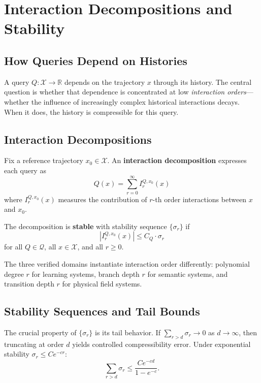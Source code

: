 \chapter{Interaction Decompositions and Stability}

\section{How Queries Depend on Histories}

A query $Q : \mathcal{X} \to \mathbb{R}$ depends on the trajectory $x$ through its history. The central question is whether that dependence is concentrated at low \emph{interaction orders}---whether the influence of increasingly complex historical interactions decays. When it does, the history is compressible for this query.

\section{Interaction Decompositions}

Fix a reference trajectory $x_0 \in \mathcal{X}$. An \textbf{interaction decomposition} expresses each query as
\[
  Q(x) = \sum_{r=0}^{\infty} I_r^{Q,x_0}(x)
\]
where $I_r^{Q,x_0}(x)$ measures the contribution of $r$-th order interactions between $x$ and $x_0$.

\begin{definition}
The decomposition is \textbf{stable} with stability sequence $\{\sigma_r\}$ if
\[
  |I_r^{Q,x_0}(x)| \leq C_Q \cdot \sigma_r
\]
for all $Q \in \mathcal{Q}$, all $x \in \mathcal{X}$, and all $r \geq 0$.
\end{definition}

The three verified domains instantiate interaction order differently: polynomial degree $r$ for learning systems, branch depth $r$ for semantic systems, and transition depth $r$ for physical field systems.

\section{Stability Sequences and Tail Bounds}

The crucial property of $\{\sigma_r\}$ is its tail behavior. If $\sum_{r>d} \sigma_r \to 0$ as $d \to \infty$, then truncating at order $d$ yields controlled compressibility error. Under exponential stability $\sigma_r \leq Ce^{-cr}$:
\[
  \sum_{r>d} \sigma_r \leq \frac{Ce^{-cd}}{1 - e^{-c}}.
\]

